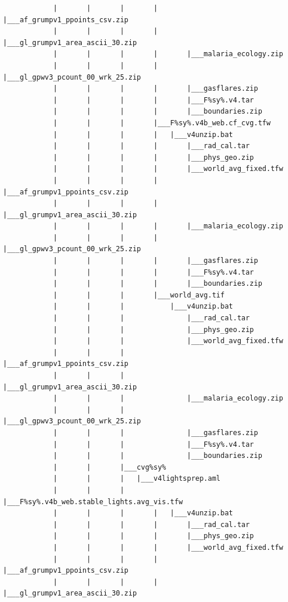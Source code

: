 \documentclass[]{book}
\begin{document}
\begin{verbatim}
            |       |       |       |       |___af_grumpv1_ppoints_csv.zip
            |       |       |       |       |___gl_grumpv1_area_ascii_30.zip
            |       |       |       |       |___malaria_ecology.zip
            |       |       |       |       |___gl_gpwv3_pcount_00_wrk_25.zip
            |       |       |       |       |___gasflares.zip
            |       |       |       |       |___F%sy%.v4.tar
            |       |       |       |       |___boundaries.zip
            |       |       |       |___F%sy%.v4b_web.cf_cvg.tfw
            |       |       |       |   |___v4unzip.bat
            |       |       |       |       |___rad_cal.tar
            |       |       |       |       |___phys_geo.zip
            |       |       |       |       |___world_avg_fixed.tfw
            |       |       |       |       |___af_grumpv1_ppoints_csv.zip
            |       |       |       |       |___gl_grumpv1_area_ascii_30.zip
            |       |       |       |       |___malaria_ecology.zip
            |       |       |       |       |___gl_gpwv3_pcount_00_wrk_25.zip
            |       |       |       |       |___gasflares.zip
            |       |       |       |       |___F%sy%.v4.tar
            |       |       |       |       |___boundaries.zip
            |       |       |       |___world_avg.tif
            |       |       |           |___v4unzip.bat
            |       |       |               |___rad_cal.tar
            |       |       |               |___phys_geo.zip
            |       |       |               |___world_avg_fixed.tfw
            |       |       |               |___af_grumpv1_ppoints_csv.zip
            |       |       |               |___gl_grumpv1_area_ascii_30.zip
            |       |       |               |___malaria_ecology.zip
            |       |       |               |___gl_gpwv3_pcount_00_wrk_25.zip
            |       |       |               |___gasflares.zip
            |       |       |               |___F%sy%.v4.tar
            |       |       |               |___boundaries.zip
            |       |       |___cvg%sy%
            |       |       |   |___v4lightsprep.aml
            |       |       |       |___F%sy%.v4b_web.stable_lights.avg_vis.tfw
            |       |       |       |   |___v4unzip.bat
            |       |       |       |       |___rad_cal.tar
            |       |       |       |       |___phys_geo.zip
            |       |       |       |       |___world_avg_fixed.tfw
            |       |       |       |       |___af_grumpv1_ppoints_csv.zip
            |       |       |       |       |___gl_grumpv1_area_ascii_30.zip

\end{verbatim}
\end{document}
